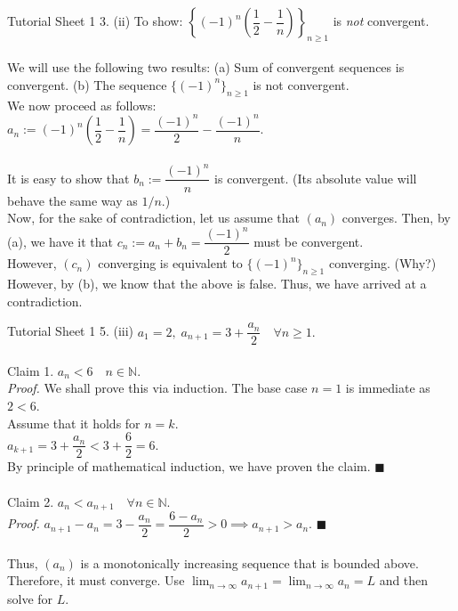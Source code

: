 \documentclass[aspectratio=169]{beamer}
\begin{document}
\begin{frame}{Tutorial Sheet 1}
    3. (ii) To show: $\left\{(-1)^n\left(\dfrac{1}{2}-\dfrac{1}{n}\right)\right\}_{n \ge 1}$ is \emph{not} convergent. \\~\\
    We will use the following two results: (a) Sum of convergent sequences is convergent. (b) The sequence $\{(-1)^n\}_{n\ge1}$ is not convergent. \\
    We now proceed as follows: \\
    $a_n := (-1)^n\left(\dfrac{1}{2}-\dfrac{1}{n}\right) = \dfrac{(-1)^n}{2} - \dfrac{(-1)^n}{n}.$ \\~\\
    It is easy to show that $b_n := \dfrac{(-1)^n}{n}$ is convergent. (Its absolute value will behave the same way as $1/n.$) \\
    Now, for the sake of contradiction, let us assume that $(a_n)$ converges. Then, by (a), we have it that $c_n := a_n + b_n = \dfrac{(-1)^n}{2}$ must be convergent. \\
    However, $(c_n)$ converging is equivalent to $\{(-1)^n\}_{n\ge1}$ converging. (Why?) \\
    However, by (b), we know that the above is false. Thus, we have arrived at a contradiction.
\end{frame}

\begin{frame}{Tutorial Sheet 1}
	5. (iii) $a_1 = 2,\;a_{n+1} = 3 + \dfrac{a_n}{2} \quad \forall n \ge 1.$ \\~\\
	Claim 1. $a_n < 6 \quad n \in \mathbb{N}.$ \\
	\emph{Proof.}  We shall prove this via induction. The base case $n = 1$ is immediate as $2 < 6$. \\
	Assume that it holds for $n = k.$ \\
	$a_{k+1} = 3 + \dfrac{a_n}{2} < 3 + \dfrac{6}{2} = 6.$ \\
	By principle of mathematical induction, we have proven the claim. \hfill $\blacksquare$ \\~\\
	Claim 2. $a_n < a_{n+1} \quad \forall n \in \mathbb{N}.$ \\
	\emph{Proof.} $a_{n+1} - a_n = 3 - \dfrac{a_n}{2} = \dfrac{6 - a_n}{2} > 0 \implies a_{n+1} > a_n.$ \hfill $\blacksquare$ \\~\\
	Thus, $(a_n)$ is a monotonically increasing sequence that is bounded above. Therefore, it must converge. Use $\displaystyle\lim_{n\to \infty}a_{n+1} = \lim_{n\to \infty}a_n = L$ and then solve for $L$.
\end{frame}
\end{document}
